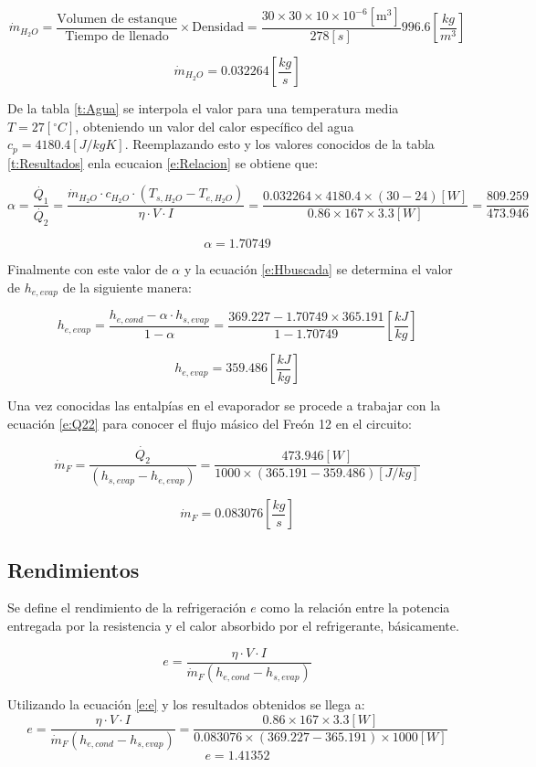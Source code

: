 \documentclass[11pt,letterpaper]{extarticle}        %
\numberwithin{equation}{section}                    %
\newcommand{\grados}{^{\circ}}                      %
\begin{document}
$$ \dot{m}_{H_2O} = \frac{\text{Volumen de estanque}}{\text{Tiempo de llenado}}\times\text{Densidad}=\frac{ 30 \times 30 \times 10 \times 10^{-6} [\text{m}^3]}{278[s]} 996.6\left[\frac{kg}{m^3}\right]$$

$$ \dot{m}_{H_2O}
=0.032264\left[\frac{kg}{s}\right]$$

De la tabla \ref{t:Agua} se interpola el valor para una temperatura media $T=27[\grados C]$, obteniendo un valor del calor específico del agua $c_p = 4180.4[J/kgK]$. Reemplazando esto y los valores conocidos de la tabla \ref{t:Resultados} enla ecucaion \ref{e:Relacion} se obtiene que:

$$ \alpha =\frac{\dot{Q_1}}{\dot{Q_2}}=
\frac{\dot{m}_{H_2O} \cdot c_{H_2O} \cdot (T_{s,H_2O}-T_{e,H_2O})}
{\eta \cdot V \cdot I}=
\frac{0.032264 \times 4180.4 \times (30-24)[W]}
{0.86\times 167 \times 3.3 [W]}
=\frac{809.259}{473.946}
 $$
 
$$\alpha = 1.70749$$

Finalmente con este valor de $\alpha$ y la ecuación \ref{e:Hbuscada} se determina el valor de $h_{e,evap}$ de la siguiente manera:

$$h_{e,evap} =
\frac{h_{e,cond}-\alpha \cdot h_{s,evap}}{1-\alpha}=
\frac{369.227-1.70749 \times 365.191}{1-1.70749}\left[\frac{kJ}{kg}\right]
$$

$$h_{e,evap} = 359.486\left[\frac{kJ}{kg}\right]$$

Una vez conocidas las entalpías en el evaporador se procede a trabajar con la ecuación \ref{e:Q22} para conocer el flujo másico del Freón 12 en el circuito:

$$
\dot{m}_F = \frac{\dot{Q_2}}{(h_{s,evap} - h_{e,evap})} = 
\frac{473.946[W]}{1000\times(365.191 - 359.486)[J/kg]} 
$$

$$
\dot{m}_F = 0.083076 \left[ \frac{kg}{s}\right]
$$

\subsection{Rendimientos}
Se define el rendimiento de la refrigeración $e$ como la relación entre la potencia entregada por la resistencia y el calor absorbido por el refrigerante, básicamente.

\begin{equation}
\label{e:e}
e = \frac{\eta \cdot V \cdot I}{\dot{m}_F(h_{e,cond}-h_{s,evap})}
\end{equation}

Utilizando la ecuación \ref{e:e} y los resultados obtenidos se llega a:
$$
e = \frac{\eta \cdot V \cdot I}{\dot{m}_F(h_{e,cond}-h_{s,evap})} =
\frac{0.86 \times 167 \times 3.3[W]}{0.083076 \times(369.227-365.191)\times 1000[W]}
$$
$$e = 1.41352$$
\end{document}
